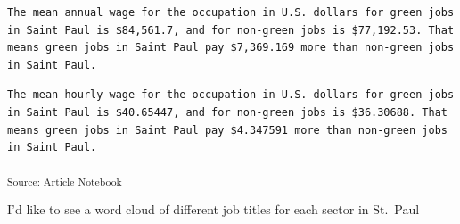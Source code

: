 \documentclass[
  letterpaper,
  DIV=11,
  numbers=noendperiod]{scrartcl}
\newenvironment{Shaded}{\begin{snugshade}}{\end{snugshade}}
\newcommand{\AttributeTok}[1]{\textcolor[rgb]{0.40,0.45,0.13}{#1}}
\newcommand{\ConstantTok}[1]{\textcolor[rgb]{0.56,0.35,0.01}{#1}}
\newcommand{\DecValTok}[1]{\textcolor[rgb]{0.68,0.00,0.00}{#1}}
\newcommand{\FunctionTok}[1]{\textcolor[rgb]{0.28,0.35,0.67}{#1}}
\newcommand{\NormalTok}[1]{\textcolor[rgb]{0.00,0.23,0.31}{#1}}
\newcommand{\SpecialCharTok}[1]{\textcolor[rgb]{0.37,0.37,0.37}{#1}}
\newcommand{\StringTok}[1]{\textcolor[rgb]{0.13,0.47,0.30}{#1}}
\begin{document}
\begin{verbatim}
The mean annual wage for the occupation in U.S. dollars for green jobs in Saint Paul is $84,561.7, and for non-green jobs is $77,192.53. That means green jobs in Saint Paul pay $7,369.169 more than non-green jobs in Saint Paul.
\end{verbatim}

\begin{Shaded}
\end{Shaded}

\begin{verbatim}
The mean hourly wage for the occupation in U.S. dollars for green jobs in Saint Paul is $40.65447, and for non-green jobs is $36.30688. That means green jobs in Saint Paul pay $4.347591 more than non-green jobs in Saint Paul.
\end{verbatim}

\textsubscript{Source:
\href{https://beeckcenter.github.io/climate-equity-workforce/index-preview.html}{Article
Notebook}}

I'd like to see a word cloud of different job titles for each sector in
St.~Paul
\end{document}
